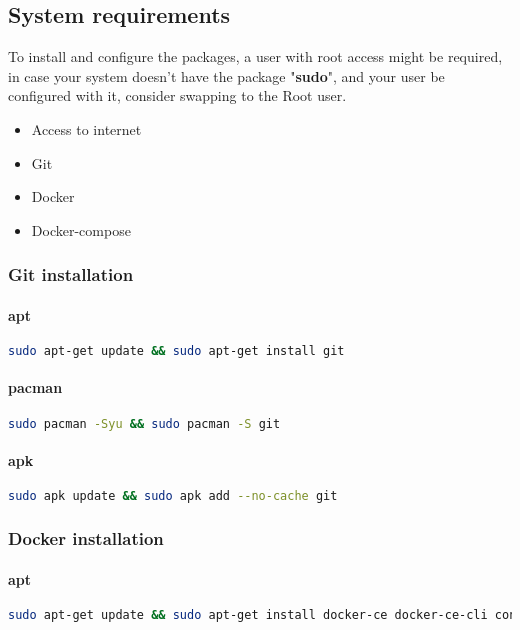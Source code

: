 \subsection{System requirements}\label{subsec:system-requirements}
\begin{flushleft}
    To install and configure the packages, a user with root access might be required, in case your system doesn't have the package
    "\textbf{sudo}", and your user be configured with it, consider swapping to the Root user.
\end{flushleft}

\begin{itemize}
    \item Access to internet
    \item Git
    \item Docker
    \item Docker-compose
\end{itemize}

\subsubsection{Git installation}
\paragraph{apt} \begin{lstlisting}[language=bash,label={lst:apt-git}]
sudo apt-get update && sudo apt-get install git
\end{lstlisting}
\paragraph{pacman} \begin{lstlisting}[language=bash,label={lst:pacman-git}]
sudo pacman -Syu && sudo pacman -S git
\end{lstlisting}
\paragraph{apk} \begin{lstlisting}[language=bash,label={lst:apk-git}]
sudo apk update && sudo apk add --no-cache git
\end{lstlisting}


\subsubsection{Docker installation}
\paragraph{apt} \begin{lstlisting}[language=bash,label={lst:apt-docker}]
sudo apt-get update && sudo apt-get install docker-ce docker-ce-cli containerd.io
\end{lstlisting}
